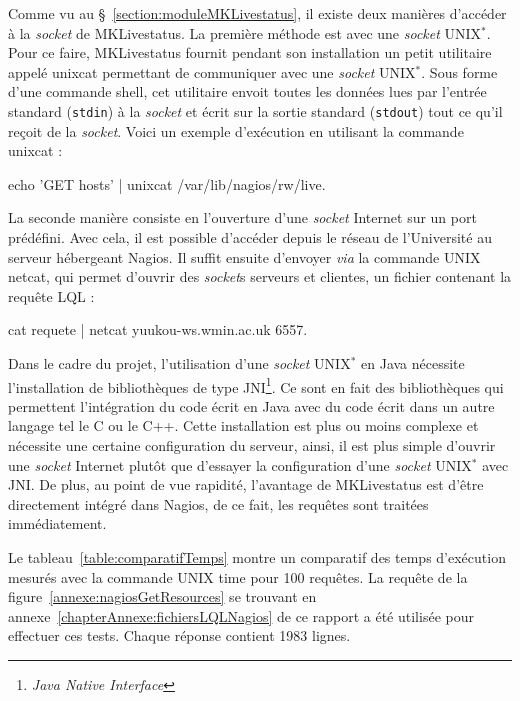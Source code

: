 Comme vu au \S~\ref{section:moduleMKLivestatus}, il existe deux mani\`eres d'acc\'eder \`a la \textit{socket} de MKLivestatus.
La premi\`ere m\'ethode est avec une \textit{socket} UNIX$^*$. 
Pour ce faire, MKLivestatus fournit pendant son installation un petit utilitaire appel\'e \textsf{unixcat} permettant de communiquer avec une \textit{socket} UNIX$^*$.
Sous forme d'une commande shell, cet utilitaire envoit toutes les donn\'ees lues par l'entr\'ee standard (\texttt{stdin}) \`a la \textit{socket} et \'ecrit sur la sortie standard (\texttt{stdout}) tout ce qu'il re\c{c}oit de la \textit{socket}.
Voici un exemple d'ex\'ecution en utilisant la commande \textsf{unixcat} : 

\begin{center}
	\textsf{echo 'GET hosts' | unixcat /var/lib/nagios/rw/live}.

\end{center}

La seconde mani\`ere consiste en l'ouverture d'une \textit{socket} Internet sur un port pr\'ed\'efini.
Avec cela, il est possible d'acc\'eder depuis le r\'eseau de l'Universit\'e au serveur h\'ebergeant Nagios.
Il suffit ensuite d'envoyer \textit{via} la commande UNIX \textsf{netcat}, qui permet d'ouvrir des \textit{socket}s serveurs et clientes, un fichier contenant la requ\^ete LQL :

\begin{center}
	\textsf{cat requete | netcat yuukou-ws.wmin.ac.uk 6557}.

\end{center}

Dans le cadre du projet, l'utilisation d'une \textit{socket} UNIX$^*$ en Java n\'ecessite l'installation de biblioth\`eques de type JNI\protect\footnote{\textit{Java Native Interface}}.
Ce sont en fait des biblioth\`eques qui permettent l'int\'egration du code \'ecrit en Java avec du code \'ecrit dans un autre langage tel le C ou le C++.
Cette installation est plus ou moins complexe et n\'ecessite une certaine configuration du serveur, ainsi, il est plus simple d'ouvrir une \textit{socket} Internet plut\^ot que d'essayer la configuration d'une \textit{socket} UNIX$^*$ avec JNI.
De plus, au point de vue rapidit\'e, l'avantage de MKLivestatus est d'\^etre directement int\'egr\'e dans Nagios, de ce fait, les requ\^etes sont trait\'ees imm\'ediatement.

Le tableau~\ref{table:comparatifTemps} montre un comparatif des temps d'ex\'ecution mesur\'es avec la commande UNIX \textsf{time} pour 100 requ\^etes.
La requ\^ete de la figure~\ref{annexe:nagiosGetResources} se trouvant en annexe~\ref{chapterAnnexe:fichiersLQLNagios} de ce rapport a \'et\'e utilis\'ee pour effectuer ces tests.
Chaque r\'eponse contient 1983 lignes.

